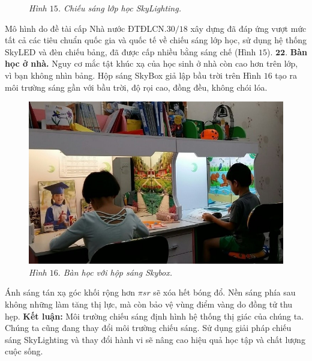\begin{multicols}{2}
\begin{figure}[H]
		\caption{\small\textit{\color{timhieukhoahoc}Hình $15$. Chiếu sáng lớp học SkyLighting.}}
		\vspace*{-10pt}
	\end{figure}
	Mô hình do đề tài cấp Nhà nước ĐTĐLCN.$30/18$ xây dựng đã đáp ứng vượt mức tất cả các tiêu chuẩn quốc gia và quốc tế về chiếu sáng lớp học, sử dụng hệ thống SkyLED và đèn chiếu bảng, đã được cấp nhiều bằng sáng chế (Hình $15$).
	\vskip 0.1cm
	$\pmb{22.}$ \textbf{\color{timhieukhoahoc}Bàn học ở nhà.}
	\vskip 0.1cm
	Nguy cơ mắc tật khúc xạ của học sinh ở nhà còn cao hơn trên lớp, vì bạn không nhìn bảng. Hộp sáng SkyBox giả lập bầu trời trên Hình $16$ tạo ra môi trường sáng gần với bầu trời, độ rọi cao, đồng đều, không chói lóa. 
	\begin{figure}[H]
		\vspace*{-5pt}
		\centering
		\captionsetup{labelformat= empty, justification=centering}
		\includegraphics[width= 1\linewidth]{16}
		\caption{\small\textit{\color{timhieukhoahoc}Hình $16.$ Bàn học với hộp sáng Skybox.}}
		\vspace*{-5pt}
	\end{figure}
	Ánh sáng tán xạ góc khối rộng hơn $\pi sr$ sẽ xóa hết bóng đổ. Nền sáng phía sau không những làm tăng thị lực, mà còn bảo vệ vùng điểm vàng do đồng tử thu hẹp. 
	\vskip 0.1cm
	\textbf{\color{timhieukhoahoc}Kết luận:}
	\vskip 0.1cm
	Môi trường chiếu sáng định hình hệ thống thị giác của chúng ta. Chúng ta cũng đang thay đổi môi trường chiếu sáng. Sử dụng giải pháp chiếu sáng SkyLighting và thay đổi hành vi sẽ nâng cao hiệu quả học tập và chất lượng cuộc sống. 
\end{multicols}



